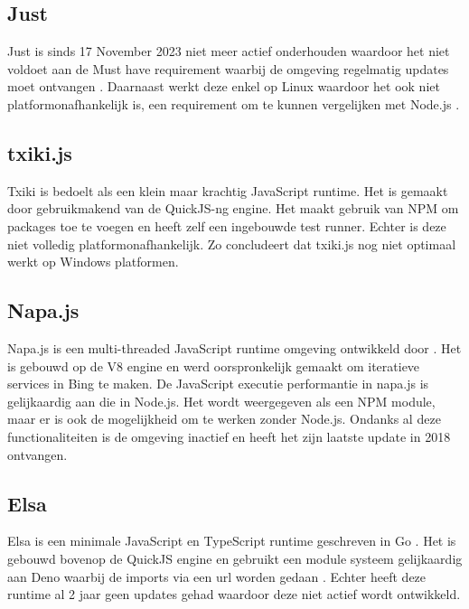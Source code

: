 \subsection{Just}
Just is sinds 17 November 2023 niet meer actief onderhouden waardoor het niet voldoet aan de Must 
have requirement waarbij de omgeving regelmatig updates moet ontvangen \autocite{Johnston2023}.
Daarnaast werkt deze enkel op Linux waardoor het ook niet platformonafhankelijk is, 
een requirement om te kunnen vergelijken met Node.js \autocite{Johnston2023}.

\subsection{txiki.js}
Txiki is bedoelt als een klein maar krachtig JavaScript runtime. 
Het is gemaakt door \textcite{Corretge2024} gebruikmakend van de QuickJS-ng engine. 
Het maakt gebruik van NPM om packages toe te voegen en heeft zelf een ingebouwde test runner. 
Echter is deze niet volledig platformonafhankelijk. 
Zo concludeert \textcite{Corretge2024} dat txiki.js nog niet optimaal werkt op Windows platformen.

\subsection{Napa.js}
Napa.js is een multi-threaded JavaScript runtime omgeving ontwikkeld door \textcite{Microsoft2018}. 
Het is gebouwd op de V8 engine en werd oorspronkelijk gemaakt om iteratieve services in Bing te maken.
De JavaScript executie performantie in napa.js is gelijkaardig aan die in Node.js. 
Het wordt weergegeven als een NPM module, maar er is ook de mogelijkheid om te werken zonder Node.js.
Ondanks al deze functionaliteiten is de omgeving inactief en heeft het zijn laatste update in 2018 ontvangen.

\subsection{Elsa}
Elsa is een minimale JavaScript en TypeScript runtime geschreven in Go \autocite{Garcia2022}. 
Het is gebouwd bovenop de QuickJS engine en gebruikt een module systeem gelijkaardig aan Deno waarbij de imports via een url worden gedaan \autocite{Garcia2022}.
Echter heeft deze runtime al 2 jaar geen updates gehad waardoor deze niet actief wordt ontwikkeld.

